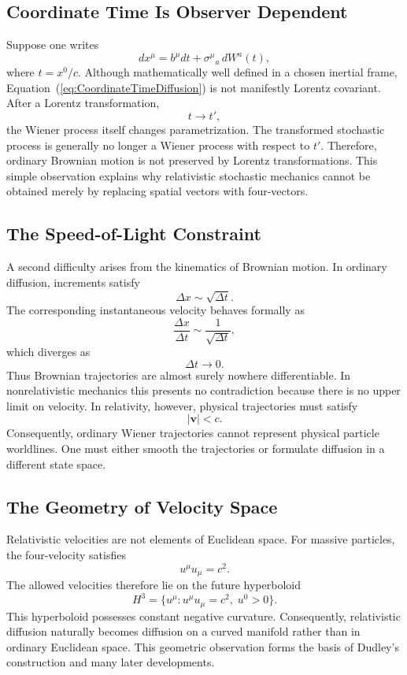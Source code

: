 \subsection{Coordinate Time Is Observer Dependent}
Suppose one writes
\begin{equation}
dx^\mu=b^\mu dt+\sigma^\mu{}_a\,dW^a(t),
\label{eq:CoordinateTimeDiffusion}
\end{equation}
where \(t=x^0/c\).
Although mathematically well defined in a chosen inertial frame,
Equation~(\ref{eq:CoordinateTimeDiffusion}) is not manifestly Lorentz
covariant.
After a Lorentz transformation,
\[t\rightarrow t',\]
the Wiener process itself changes parametrization.
The transformed stochastic process is generally no longer a Wiener
process with respect to \(t'\).
Therefore,
ordinary Brownian motion is not preserved by Lorentz transformations.
This simple observation explains why relativistic stochastic mechanics
cannot be obtained merely by replacing spatial vectors with four-vectors.
\subsection{The Speed-of-Light Constraint}
A second difficulty arises from the kinematics of Brownian motion.
In ordinary diffusion,
increments satisfy
\[\Delta x\sim\sqrt{\Delta t}.\]
The corresponding instantaneous velocity behaves formally as
\[\frac{\Delta x}{\Delta t}\sim\frac{1}{\sqrt{\Delta t}},\]
which diverges as
\[\Delta t\rightarrow0.\]
Thus Brownian trajectories are almost surely nowhere differentiable.
In nonrelativistic mechanics this presents no contradiction because
there is no upper limit on velocity.
In relativity,
however,
physical trajectories must satisfy
\[|\mathbf v|<c.\]
Consequently,
ordinary Wiener trajectories cannot represent physical particle
worldlines.
One must either smooth the trajectories or formulate diffusion in a
different state space.
\subsection{The Geometry of Velocity Space}
Relativistic velocities are not elements of Euclidean space.
For massive particles,
the four-velocity satisfies
\begin{equation}
u^\mu u_\mu=c^2.
\label{eq:MassShell}
\end{equation}
The allowed velocities therefore lie on the future hyperboloid
\[H^3=\{u^\mu:u^\mu u_\mu=c^2,\;u^0>0\}.\]
This hyperboloid possesses constant negative curvature.
Consequently,
relativistic diffusion naturally becomes diffusion on a curved manifold
rather than in ordinary Euclidean space.
This geometric observation forms the basis of Dudley's construction and
many later developments.
